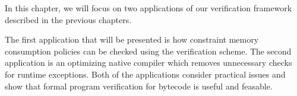 

In this chapter, we will focus on two applications of our verification 
framework described in the previous chapters.  


The first application that will be presented is how
constraint memory consumption policies can be checked using the
verification scheme. 
The second application is an optimizing native compiler which removes
unnecessary checks for runtime exceptions.
Both of the applications consider practical issues and show that
 formal program verification for bytecode is useful and feasable.
 
